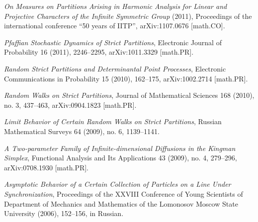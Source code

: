 \documentclass[letterpaper,11pt]{article}
\begin{document}
\begin{etaremune}
    \item \emph{On Measures on Partitions Arising in Harmonic Analysis for Linear and Projective Characters of the Infinite Symmetric Group} (2011), Proceedings of the international conference ``50 years of IITP'', arXiv:1107.0676 [math.CO].
    \item  \emph{Pfaffian Stochastic Dynamics of Strict Partitions},  Electronic Journal of Probability 16 (2011), 2246--2295, arXiv:1011.3329 [math.PR].
    \item \emph{Random Strict Partitions and Determinantal Point Processes}, Electronic Communications in Probability 15 (2010), 162--175, arXiv:1002.2714 [math.PR].
    \item  \emph{Random Walks on Strict Partitions}, Journal of Mathematical Sciences 168 (2010), no. 3, 437--463, arXiv:0904.1823 [math.PR].  
    \item  \emph{Limit Behavior of Certain Random Walks on Strict Partitions}, Russian Mathematical Surveys 64 (2009), no. 6, 1139--1141.
    \item  \emph{A Two-parameter Family of Infinite-dimensional Diffusions in the Kingman Simplex}, Functional Analysis and Its Applications 43 (2009), no. 4, 279--296, arXiv:0708.1930 [math.PR].
     \item 
    \emph{Asymptotic Behavior of a Certain Collection of Particles on a Line Under Synchronization}, Proceedings of the XXVIII Conference of Young Scientists of Department of Mechanics and Mathematics of the Lomonosov Moscow State University (2006), 152--156, in Russian.
\end{etaremune}
\end{document}
